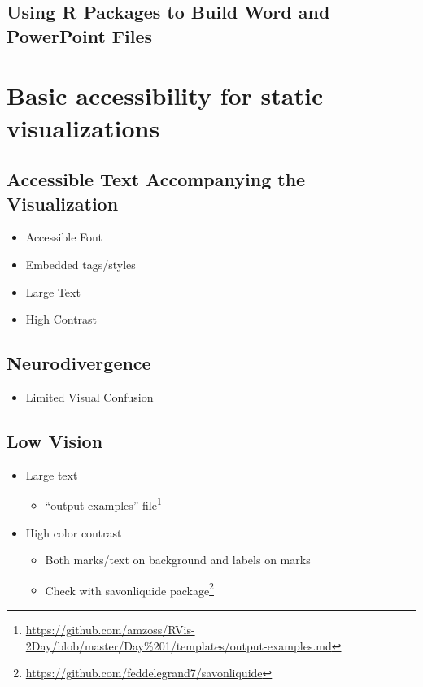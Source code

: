 \documentclass[
]{krantz}
\providecommand{\tightlist}{%
  \setlength{\itemsep}{0pt}\setlength{\parskip}{0pt}}
\renewcommand{\href}[2]{#2\footnote{\url{#1}}}
\begin{document}
\hypertarget{using-r-packages-to-build-word-and-powerpoint-files}{%
\section{Using R Packages to Build Word and PowerPoint Files}\label{using-r-packages-to-build-word-and-powerpoint-files}}

\hypertarget{accessibility-for-visualizations}{%
\chapter{Basic accessibility for static visualizations}\label{accessibility-for-visualizations}}

\hypertarget{accessible-text-accompanying-the-visualization}{%
\section{Accessible Text Accompanying the Visualization}\label{accessible-text-accompanying-the-visualization}}

\begin{itemize}
\tightlist
\item
  Accessible Font
\item
  Embedded tags/styles
\item
  Large Text
\item
  High Contrast
\end{itemize}

\hypertarget{neurodivergence}{%
\section{Neurodivergence}\label{neurodivergence}}

\begin{itemize}
\tightlist
\item
  Limited Visual Confusion
\end{itemize}

\hypertarget{low-vision}{%
\section{Low Vision}\label{low-vision}}

\begin{itemize}
\item
  Large text

  \begin{itemize}
  \tightlist
  \item
    \href{https://github.com/amzoss/RVis-2Day/blob/master/Day\%201/templates/output-examples.md}{``output-examples'' file}
  \end{itemize}
\item
  High color contrast

  \begin{itemize}
  \item
    Both marks/text on background and labels on marks
  \item
    Check with \href{https://github.com/feddelegrand7/savonliquide}{savonliquide package}
  \end{itemize}
\end{itemize}
\end{document}
